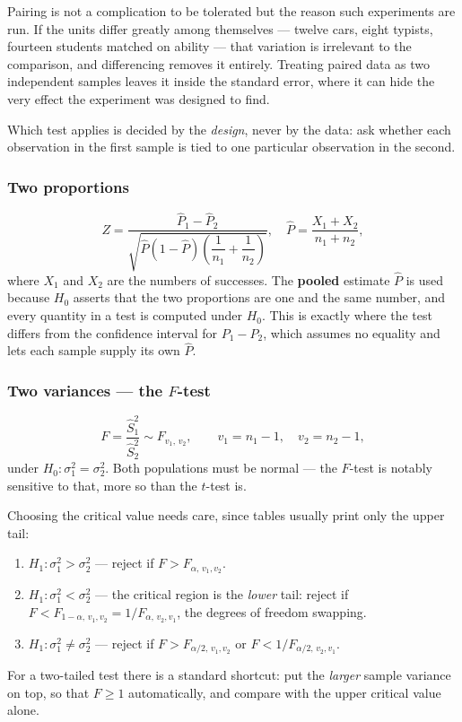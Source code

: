 \documentclass[11pt,a4paper]{article}
\theoremstyle{definition}
\begin{document}
Pairing is not a complication to be tolerated but the reason such experiments are run. If
the units differ greatly among themselves --- twelve cars, eight typists, fourteen students
matched on ability --- that variation is irrelevant to the comparison, and differencing
removes it entirely. Treating paired data as two independent samples leaves it inside the
standard error, where it can hide the very effect the experiment was designed to find.

Which test applies is decided by the \emph{design}, never by the data: ask whether each
observation in the first sample is tied to one particular observation in the second.

\subsubsection{Two proportions}
\[Z=\frac{\hat{P}_1-\hat{P}_2}
{\sqrt{\hat{P}(1-\hat{P})\left(\dfrac{1}{n_1}+\dfrac{1}{n_2}\right)}},
\quad 
\hat{P}=\frac{X_1+X_2}{n_1+n_2},\]
where $X_1$ and $X_2$ are the numbers of successes. The \textbf{pooled} estimate $\hat{P}$
is used because $H_0$ asserts that the two proportions are one and the same number, and every
quantity in a test is computed under $H_0$. This is exactly where the test differs from the
confidence interval for $P_1-P_2$, which assumes no equality and lets each sample supply its
own $\hat{P}$.

\subsubsection{Two variances --- the $F$-test}
\[F=\frac{\hat{S}_1^2}{\hat{S}_2^2}\sim F_{v_1,\,v_2},\qquad v_1=n_1-1,\quad v_2=n_2-1,\]
under $H_0:\sigma_1^2=\sigma_2^2$. Both populations must be normal --- the $F$-test is
notably sensitive to that, more so than the $t$-test is.

Choosing the critical value needs care, since tables usually print only the upper tail:
\begin{enumerate}
\item[$\bullet$] $H_1:\sigma_1^2>\sigma_2^2$ --- reject if $F>F_{\alpha,\,v_1,v_2}$.
\item[$\bullet$] $H_1:\sigma_1^2<\sigma_2^2$ --- the critical region is the \emph{lower}
tail: reject if $F<F_{1-\alpha,\,v_1,v_2}=1/F_{\alpha,\,v_2,v_1}$, the degrees of freedom
swapping.
\item[$\bullet$] $H_1:\sigma_1^2\neq\sigma_2^2$ --- reject if $F>F_{\alpha/2,\,v_1,v_2}$ or
$F<1/F_{\alpha/2,\,v_2,v_1}$.
\end{enumerate}
For a two-tailed test there is a standard shortcut: put the \emph{larger} sample variance on
top, so that $F\geq 1$ automatically, and compare with the upper critical value alone.
\end{document}
